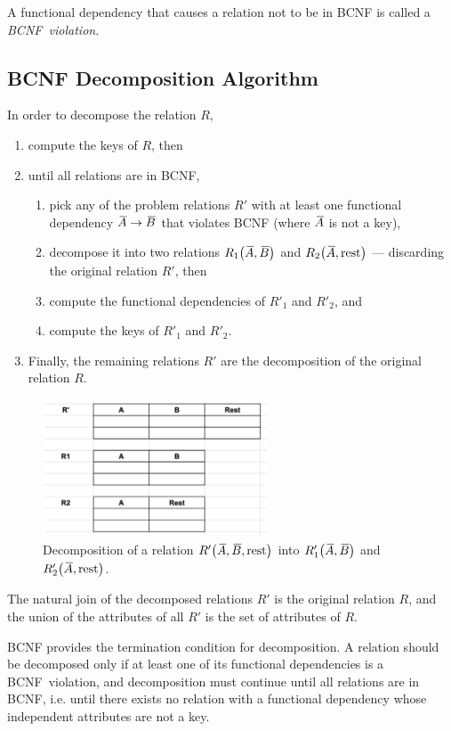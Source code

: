 A functional dependency that causes a relation not to be in BCNF is called a \emph{BCNF~violation}.

\subsection{BCNF Decomposition Algorithm}

In order to decompose the relation \( R \),
\begin{enumerate}
  \item compute the keys of \( R \), then
  \item until all relations are in BCNF,
  \begin{enumerate}
    \item pick any of the problem relations \( R' \) with at least one functional dependency \( {}\mkern3mu\overline{\mkern-3muA} \rightarrow {}\mkern3mu\overline{\mkern-3muB} \) that violates BCNF (where \( {}\mkern3mu\overline{\mkern-3muA} \) is not a key),
    \item decompose it into two relations \( R_1\!\left( {}\mkern3mu\overline{\mkern-3muA}, {}\mkern3mu\overline{\mkern-3muB} \right) \) and \( R_2\!\left( {}\mkern3mu\overline{\mkern-3muA}, \text{rest} \right) \) --- discarding the original relation \( R' \), then
    \item compute the functional dependencies of \( R'_1 \) and \( R'_2 \), and
    \item compute the keys of \( R'_1 \) and \( R'_2 \).
  \end{enumerate}
  \item Finally, the remaining relations \( R' \) are the decomposition of the original relation \( R \).
\end{enumerate}

\begin{figure}[htp]
  \centering
  \includegraphics[width=0.6\textwidth]{unit-3/figures/decomposition.jpg}
  \caption*{Decomposition of a relation \( R'\!\left( {}\mkern3mu\overline{\mkern-3muA}, {}\mkern3mu\overline{\mkern-3muB}, \text{rest} \right) \) into \( R'_1\!\left( {}\mkern3mu\overline{\mkern-3muA}, {}\mkern3mu\overline{\mkern-3muB} \right) \) and \( R'_2\!\left( {}\mkern3mu\overline{\mkern-3muA}, \text{rest} \right) \).}
\end{figure}

The natural join of the decomposed relations \( R' \) is the original relation \( R \), and the union of the attributes of all \( R' \) is the set of attributes of \( R \).

BCNF provides the termination condition for decomposition.
A relation should be decomposed only if at least one of its functional dependencies is a BCNF~violation, and decomposition must continue until all relations are in BCNF, i.e. until there exists no relation with a functional dependency whose independent attributes are not a key.
